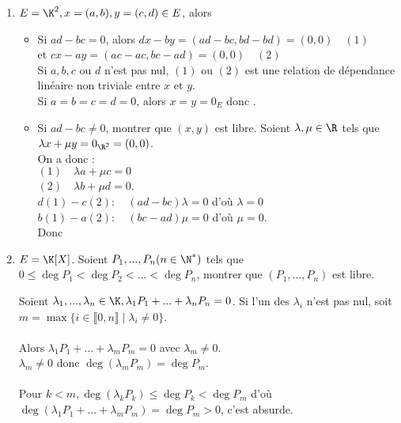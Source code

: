 \documentclass[12pt, a4paper]{report}
\begin{document}
\begin{exemple}[Exemples]
\begin{enumerate}
    \item $E= \K^2, x=(a,b), y=(c,d) \in E$, alors 
    \begin{itemize}
    \item Si $ad-bc=0$, alors $dx-by = (ad-bc,bd-bd) = (0,0) \quad (1)$ \\
    	et $cx-ay = (ac-ac,bc-ad)=(0,0) \quad (2)$ \\
    	Si $a,b,c$ ou $d$ n'est pas nul, $(1)$ ou $(2)$ est une relation de dépendance linéaire non triviale entre $x$ et $y$. \\
    	Si $a=b=c=d=0$, alors $x=y=0_E$ donc .
    \item Si $ad-bc \neq 0$, montrer que $(x,y)$ est libre. Soient $\lambda, \mu \in \R$ tels que $\lambda x + \mu y = 0_{\R^2} = (0,0)$. \\
    	On a donc :  \\
		$(1) \quad \lambda a + \mu c = 0$ \\
		$(2) \quad \lambda b + \mu d = 0$. \\
		$d (1) - c (2) : \quad (ad-bc)\lambda = 0$ d'où $\lambda = 0$ \\
		$b (1) - a (2) : \quad (bc-ad)\mu = 0$ d'où $\mu = 0$. \\
		Donc 
	\end{itemize}
	
	\item $E = \K[X]$. Soient $P_1,...,P_n (n \in \N^*)$ tels que $0 \le \deg P_1 < \deg P_2 < ... < \deg P_n$, montrer que $(P_1,...,P_n)$ est libre. \\
	\begin{demo}{}
	Soient $\lambda_1,...,\lambda_n \in \K, \lambda_1P_1+...+\lambda_nP_n = 0$. Si l'un des $\lambda_i$ n'est pas nul, soit $m = \max \{i \in \llbracket 0,n \rrbracket \mid \lambda_i \ne 0\}$. \\ \\
	Alors $\lambda_1P_1+...+\lambda_mP_m = 0$ avec $\lambda_m \ne 0$. \\
	$\lambda_m \ne 0$ donc $\deg(\lambda_mP_m) = \deg P_m$. \\ \\
	Pour $k < m, \deg (\lambda_kP_k) \le \deg P_k < \deg P_m$ d'où $\deg (\lambda_1P_1+...+\lambda_mP_m) = \deg P_m > 0$, c'est absurde.
	\end{demo}
	

\end{enumerate}
\end{exemple}
\end{document}
